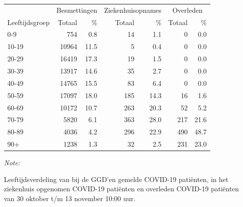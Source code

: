\documentclass[
  english,
  man,floatsintext]{apa6}
\begin{document}
\begin{table}[H]
\centering\begingroup\fontsize{11}{13}\selectfont

\begin{threeparttable}
\begin{tabular}{lrrrrrr}
\toprule
\multicolumn{1}{c}{ } & \multicolumn{2}{c}{Besmettingen} & \multicolumn{2}{c}{Ziekenhuisopnames} & \multicolumn{2}{c}{Overleden} \\
\cmidrule(l{3pt}r{3pt}){2-3} \cmidrule(l{3pt}r{3pt}){4-5} \cmidrule(l{3pt}r{3pt}){6-7}
Leeftijdsgroep & Totaal & \% & Totaal & \% & Totaal & \%\\
\midrule
0-9 & 754 & 0.8 & 14 & 1.1 & 0 & 0.0\\
10-19 & 10964 & 11.5 & 5 & 0.4 & 0 & 0.0\\
20-29 & 16419 & 17.3 & 19 & 1.5 & 0 & 0.0\\
30-39 & 13917 & 14.6 & 35 & 2.7 & 0 & 0.0\\
40-49 & 14765 & 15.5 & 83 & 6.4 & 0 & 0.0\\
50-59 & 17097 & 18.0 & 185 & 14.3 & 16 & 1.6\\
60-69 & 10172 & 10.7 & 263 & 20.3 & 52 & 5.2\\
70-79 & 5820 & 6.1 & 363 & 28.0 & 217 & 21.6\\
80-89 & 4036 & 4.2 & 296 & 22.9 & 490 & 48.7\\
90+ & 1238 & 1.3 & 32 & 2.5 & 231 & 23.0\\
\bottomrule
\end{tabular}
\begin{tablenotes}
\item \textit{Note: } 
\item Leeftijdsverdeling van bij de GGD’en gemelde COVID-19 patiënten, in het ziekenhuis opgenomen COVID-19 patiënten en overleden COVID-19 patiënten van 30 oktober t/m 13 november 10:00 uur.
\end{tablenotes}
\end{threeparttable}
\endgroup{}
\end{table}
\end{document}
